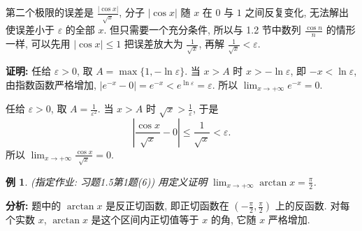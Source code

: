 \documentclass[UTF8,openany]{ctexbook}
\theoremstyle{chinesetextbook}
\newtheorem{example}{例}[section]
\newenvironment{cnproof}{\par\indent\textbf{证明:} \ignorespaces}{\par}
\begin{document}
第二个极限的误差是 $\displaystyle\frac{|\cos x|}{\sqrt x}$, 分子 $|\cos x|$ 随 $x$ 在 $0$ 与 $1$ 之间反复变化, 无法解出使误差小于 $\varepsilon$ 的全部 $x$. 但只需要一个充分条件, 所以与 1.2 节中数列 $\displaystyle\frac{\cos n}n$ 的情形一样, 可以先用 $|\cos x|\le1$ 把误差放大为 $\displaystyle\frac1{\sqrt x}$, 再解 $\displaystyle\frac1{\sqrt x}<\varepsilon$.
\begin{cnproof}
任给 $\varepsilon>0$, 取 $A=\max\{1,-\ln\varepsilon\}$. 当 $x>A$ 时 $x>-\ln\varepsilon$, 即 $-x<\ln\varepsilon$, 由指数函数严格增加, $|e^{-x}-0|=e^{-x}<e^{\ln\varepsilon}=\varepsilon$. 所以 $\displaystyle\lim_{x\to+\infty}e^{-x}=0$.

任给 $\varepsilon>0$, 取 $\displaystyle A=\frac1{\varepsilon^2}$. 当 $x>A$ 时 $\displaystyle\sqrt x>\frac1\varepsilon$, 于是
\[
\left|\frac{\cos x}{\sqrt x}-0\right|\le\frac1{\sqrt x}<\varepsilon.
\]
所以 $\displaystyle\lim_{x\to+\infty}\frac{\cos x}{\sqrt x}=0$.
\end{cnproof}
\begin{example}\label{ex:h15-1-6}
\textnormal{(指定作业: 习题1.5第1题(6))} 用定义证明 $\displaystyle\lim_{x\to+\infty}\arctan x=\frac\pi2$.
\end{example}
\par\indent\textbf{分析:} 题中的 $\arctan x$ 是反正切函数, 即正切函数在 $\displaystyle\left(-\frac\pi2,\frac\pi2\right)$ 上的反函数. 对每个实数 $x$, $\arctan x$ 是这个区间内正切值等于 $x$ 的角, 它随 $x$ 严格增加.
\end{document}
